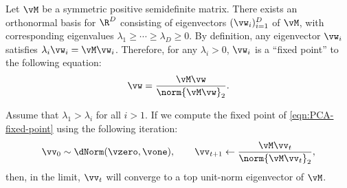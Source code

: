 \documentclass[../../book-main.tex]{subfiles}
\begin{document}
Let \(\vM\) be a symmetric positive semidefinite matrix. There exists an orthonormal basis for \(\R^{D}\) consisting of eigenvectors \((\vw_{i})_{i = 1}^{D}\) of \(\vM\), with corresponding eigenvalues \(\lambda_{1} \geq \cdots \geq \lambda_{D} \geq 0\). By definition, any eigenvector $\vw_i$ satisfies $\lambda_i \vw_i = \vM \vw_i$. Therefore, for any $\lambda_i > 0$, $\vw_i$ is a   ``fixed point'' to the following equation:
\begin{equation}
    \vw = \frac{\vM\vw}{\norm{\vM\vw}_{2}}.
    \label{eqn:PCA-fixed-point}
\end{equation}

\begin{theorem}
Assume that \(\lambda_{1} > \lambda_{i}\) for all \(i > 1\). If we compute the fixed point of  \eqref{eqn:PCA-fixed-point} using the following iteration:
\begin{equation}\label{eq:power_iteration}
    \vv_{0} \sim \dNorm(\vzero, \vone), \qquad \vv_{t + 1} \gets \frac{\vM\vv_{t}}{\norm{\vM\vv_{t}}_{2}},
\end{equation}
then, in the limit, \(\vv_{t}\) will converge to a top unit-norm eigenvector of \(\vM\).
\end{theorem}
\end{document}
